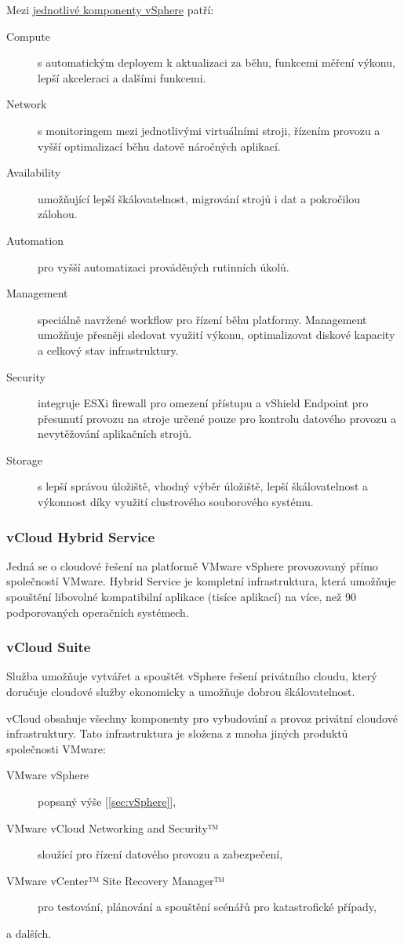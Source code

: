 Mezi \href{http://www.vmware.com/products/vsphere/features.html}{jednotlivé komponenty vSphere} patří:
\begin{description}
	\item[Compute] s automatickým deployem k aktualizaci za běhu, funkcemi měření výkonu, lepší akceleraci a dalšími funkcemi.
	\item[Network] s monitoringem mezi jednotlivými virtuálními stroji, řízením provozu a vyšší optimalizací běhu datově náročných aplikací.
	\item[Availability] umožňující lepší škálovatelnost, migrování strojů i dat a pokročilou zálohou.
	\item[Automation] pro vyšší automatizaci prováděných rutinních úkolů.
	\item[Management] speciálně navržené workflow pro řízení běhu platformy. Management umožňuje přesněji sledovat využití výkonu, optimalizovat diskové kapacity a celkový stav infrastruktury.
	\item[Security] integruje ESXi firewall pro omezení přístupu a vShield Endpoint pro přesunutí provozu na stroje určené pouze pro kontrolu datového provozu a nevytěžování aplikačních strojů.
	\item[Storage] s lepší správou úložiště, vhodný výběr úložiště, lepší škálovatelnost a výkonnost díky využití clustrového souborového systému.
\end{description}

\subsubsection{vCloud Hybrid Service}
Jedná se o cloudové řešení na platformě VMware vSphere provozovaný přímo společností VMware. Hybrid Service je kompletní infrastruktura, která umožňuje spouštění libovolné kompatibilní aplikace (tisíce aplikací) na více, než 90 podporovaných operačních systémech.\cite{vmware:hybridService}

\subsubsection{vCloud Suite}
Služba umožňuje vytvářet a spouštět vSphere řešení privátního cloudu, který doručuje cloudové služby ekonomicky a umožňuje dobrou škálovatelnost.\nocite{vmware:vCloudDatasheet}

vCloud obsahuje všechny komponenty pro vybudování a provoz privátní cloudové infrastruktury. Tato infrastruktura je složena z mnoha jiných produktů společnosti VMware:
\begin{description}
	\item[VMware vSphere] popsaný výše [\ref{sec:vSphere}],
	\item[VMware vCloud Networking and Security™] sloužící pro řízení datového provozu a zabezpečení,
	\item[VMware vCenter™ Site Recovery Manager™] pro testování, plánování a spouštění scénářů pro katastrofické případy,
	\item[a dalších.]
\end{description}

